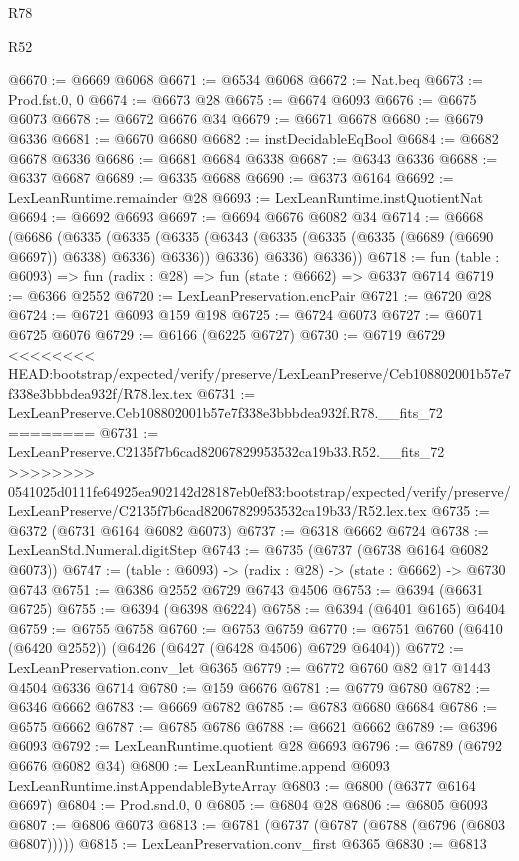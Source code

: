 \begin{lexlean}{R78}
\begin{lexlean}{R52}
\begin{coremodule}
{{{{{{{{{{{{{{{{{{{{{{{{{{{{{{{{{{{{{{{{{{{{{{{{{{{{{{{{{{{{{{{{{{{{{{{{{{{{{{{{{{{{{{{{{{{{{{{{{{{{{{{{{{{{{{{{{{{{{{{{{{{{{{{{{{{{{{{{{{{{{{{{{{{{{{{{{{{{{{{{{{{{{{{{{{{{{{{{{{{{{{{{{{{{{{{{{{{{{{@6670 := @6669 @6068
@6671 := @6534 @6068
@6672 := Nat.beq
@6673 := Prod.fst.{0, 0}
@6674 := @6673 @28
@6675 := @6674 @6093
@6676 := @6675 @6073
@6678 := @6672 @6676 @34
@6679 := @6671 @6678
@6680 := @6679 @6336
@6681 := @6670 @6680
@6682 := instDecidableEqBool
@6684 := @6682 @6678 @6336
@6686 := @6681 @6684 @6338
@6687 := @6343 @6336
@6688 := @6337 @6687
@6689 := @6335 @6688
@6690 := @6373 @6164
@6692 := LexLeanRuntime.remainder @28
@6693 := LexLeanRuntime.instQuotientNat
@6694 := @6692 @6693
@6697 := @6694 @6676 @6082 @34
@6714 := @6668
    (@6686
      (@6335
        (@6335
          (@6335 (@6343 (@6335 (@6335 (@6335 (@6689 (@6690 @6697)) @6338) @6336) @6336)) @6336)
          @6336)
        @6336))
@6718 := fun (table : @6093) => fun (radix : @28) => fun (state : @6662) => @6337 @6714
@6719 := @6366 @2552
@6720 := LexLeanPreservation.encPair
@6721 := @6720 @28
@6724 := @6721 @6093 @159 @198
@6725 := @6724 @6073
@6727 := @6071 @6725 @6076
@6729 := @6166 (@6225 @6727)
@6730 := @6719 @6729
<<<<<<<< HEAD:bootstrap/expected/verify/preserve/LexLeanPreserve/Ceb108802001b57e7f338e3bbbdea932f/R78.lex.tex
@6731 := LexLeanPreserve.Ceb108802001b57e7f338e3bbbdea932f.R78.__fits_72
========
@6731 := LexLeanPreserve.C2135f7b6cad82067829953532ca19b33.R52.__fits_72
>>>>>>>> 0541025d0111fe64925ea902142d28187eb0ef83:bootstrap/expected/verify/preserve/LexLeanPreserve/C2135f7b6cad82067829953532ca19b33/R52.lex.tex
@6735 := @6372 (@6731 @6164 @6082 @6073)
@6737 := @6318 @6662 @6724
@6738 := LexLeanStd.Numeral.digitStep
@6743 := @6735 (@6737 (@6738 @6164 @6082 @6073))
@6747 := (table : @6093) -> (radix : @28) -> (state : @6662) -> @6730 @6743
@6751 := @6386 @2552 @6729 @6743 @4506
@6753 := @6394 (@6631 @6725)
@6755 := @6394 (@6398 @6224)
@6758 := @6394 (@6401 @6165) @6404
@6759 := @6755 @6758
@6760 := @6753 @6759
@6770 := @6751 @6760 (@6410 (@6420 @2552)) (@6426 (@6427 (@6428 @4506) @6729 @6404))
@6772 := LexLeanPreservation.conv_let @6365
@6779 := @6772 @6760 @82 @17 @1443 @4504 @6336 @6714
@6780 := @159 @6676
@6781 := @6779 @6780
@6782 := @6346 @6662
@6783 := @6669 @6782
@6785 := @6783 @6680 @6684
@6786 := @6575 @6662
@6787 := @6785 @6786
@6788 := @6621 @6662
@6789 := @6396 @6093
@6792 := LexLeanRuntime.quotient @28 @6693
@6796 := @6789 (@6792 @6676 @6082 @34)
@6800 := LexLeanRuntime.append @6093 LexLeanRuntime.instAppendableByteArray
@6803 := @6800 (@6377 @6164 @6697)
@6804 := Prod.snd.{0, 0}
@6805 := @6804 @28
@6806 := @6805 @6093
@6807 := @6806 @6073
@6813 := @6781 (@6737 (@6787 (@6788 (@6796 (@6803 @6807)))))
@6815 := LexLeanPreservation.conv_first @6365
@6830 := @6813
}}}}}}}}}}}}}}}}}}}}}}}}}}}}}}}}}}}}}}}}}}}}}}}}}}}}}}}}}}}}}}}}}}}}}}}}}}}}}}}}}}}}}}}}}}}}}}}}}}}}}}}}}}}}}}}}}}}}}}}}}}}}}}}}}}}}}}}}}}}}}}}}}}}}}}}}}}}}}}}}}}}}}}}}}}}}}}}}}}}}}}}}}}}}}}}}}}}}}}
\end{coremodule}
\end{lexlean}
\end{lexlean}
